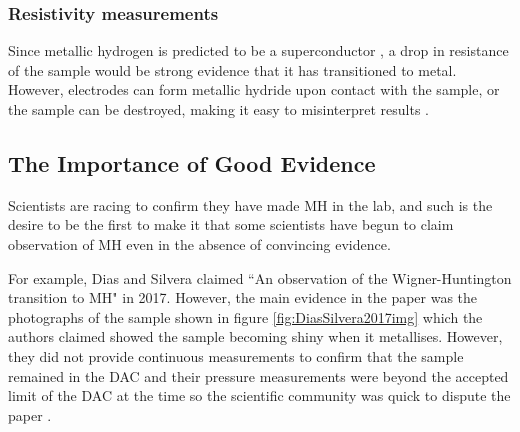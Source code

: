 \documentclass[esp]{FCEFyN-class}
\begin{document}
\subsubsection{Resistivity measurements}

Since metallic hydrogen is predicted to be a superconductor \cite{ashcroft1968metallic}, a drop in resistance of the sample would be strong evidence that it has transitioned to metal. However, electrodes can form metallic hydride upon contact with the sample, or the sample can be destroyed, making it easy to misinterpret results \cite{gregoryanz2020}.

\subsection{The Importance of Good Evidence}




Scientists are racing to confirm they have made MH in the lab, and such is the desire to be the first to make it that some scientists have begun to claim observation of MH even in the absence of convincing evidence.

For example, Dias and Silvera claimed ``An observation of the Wigner-Huntington transition to MH" \cite{dias_silvera_2017} in 2017. However, the main evidence in the paper was the photographs of the sample shown in figure \ref{fig:DiasSilvera2017img} which the authors claimed showed the sample becoming shiny when it metallises. However, they did not provide continuous measurements to confirm that the sample remained in the DAC and their pressure measurements were beyond the accepted limit of the DAC at the time so the scientific community was quick to dispute the paper \cite{goncharov2017comment,liu2017comment,eremets2017comments,loubeyre2017comment}.
\end{document}

